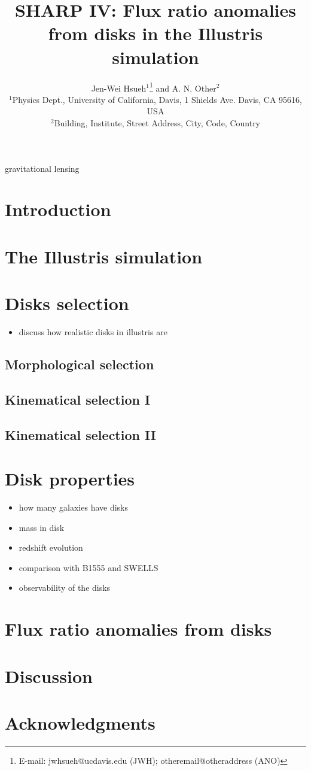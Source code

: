\documentclass[useAMS,usenatbib]{mn2e}
\title[Flux ratio anomalies from disks]{
SHARP IV: Flux ratio anomalies from disks in the Illustris simulation
}
\author[Hsueh et al.]{Jen-Wei Hsueh$^{1}$\thanks{E-mail:
jwhsueh@ucdavis.edu (JWH); otheremail@otheraddress (ANO)} and A. N.
Other$^{2}$\\
$^{1}$Physics Dept., University of California, Davis, 1 Shields Ave.
Davis, CA 95616, USA\\
$^{2}$Building, Institute, Street Address, City, Code, Country}
\begin{document}

\pagerange{\pageref{firstpage}--\pageref{lastpage}} 

\maketitle

\label{firstpage}

\begin{abstract}

\end{abstract}

\begin{keywords}
gravitational lensing
\end{keywords}

\section{Introduction}
\section{The Illustris simulation}
\section{Disks selection}
\begin{itemize}
\item discuss how realistic disks in illustris are
\end{itemize}
\subsection{Morphological selection}
\subsection{Kinematical selection I}
\subsection{Kinematical selection II}
\section{Disk properties}
\begin{itemize}
\item how many galaxies have disks
\item mass in disk
\item redshift evolution
\item comparison with B1555 and SWELLS
\item observability of the disks
\end{itemize}
\section{Flux ratio anomalies from disks}

\section{Discussion}
\section*{Acknowledgments}







\label{lastpage}
\end{document}
